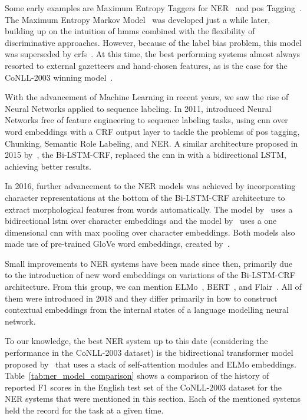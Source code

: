 \documentclass{nle}
\begin{document}
Some early examples are Maximum Entropy Taggers for NER~\cite{Borthwick1998} and
\gls{pos} Tagging~\cite{Ratnaparkhi1998}. The Maximum Entropy Markov Model~\cite{McCallum2000} 
was developed just a while later, building up on the intuition of \gls{hmm}s combined with
the flexibility of discriminative approaches. However, because of the label bias problem,
this model was superseded by \gls{crf}s~\cite{Lafferty2001}. %
At this time, the best performing systems almost always resorted to external gazetteers 
and hand-chosen features, as is the case for the {CoNLL-2003} winning model~\cite{Florian2003}.

With the advancement of Machine Learning in recent years, we saw the rise
of Neural Networks applied to sequence labeling. In 2011, \cite{Collobert2011} 
introduced Neural Networks free of feature engineering to sequence labeling tasks,
using \gls{cnn} over word embeddings with a CRF output layer to tackle 
the problems of \gls{pos} tagging, Chunking, Semantic Role Labeling, and NER. A similar architecture 
proposed in 2015 by~\cite{Huang2015}, the Bi-LSTM-CRF, replaced the \gls{cnn} in \cite{Collobert2011} 
with a bidirectional LSTM, achieving better results.

In 2016, further advancement to the NER models was achieved by incorporating character 
representations at the bottom of the Bi-LSTM-CRF architecture to extract morphological 
features from words automatically. The model by~\cite{Lample2016} uses a 
bidirectional \gls{lstm} over character embeddings and the model by~\cite{Ma2016} uses a
one dimensional \gls{cnn} with max pooling over character embeddings. Both models also 
made use of pre-trained GloVe word embeddings, created by~\cite{Pennington2014}.

Small improvements to NER systems have been made since then, primarily due to the 
introduction of new word embeddings on variations of the Bi-LSTM-CRF architecture. From
this group, we can mention ELMo~\cite{Peters2018}, BERT~\cite{Devlin2018}, and
Flair~\cite{Akbik2018}. 
All of them were introduced in 2018 and they differ primarily 
in how to construct contextual embeddings from the internal states of a language 
modelling neural network.

To our knowledge, the best NER system up to this date (considering the performance in the
{CoNLL-2003} dataset) is the bidirectional transformer model proposed by~\cite{Baevski2019} that uses
a stack of self-attention modules and ELMo embeddings. Table~\ref{tab:ner_model_comparison}
shows a comparison of the history of reported F1 scores in the English test set of the {CoNLL-2003} dataset
for the NER systems that were mentioned in this section. Each of the mentioned systems held the 
record for the task at a given time.
\end{document}
